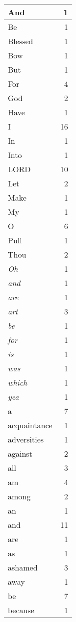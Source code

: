 \begin{center}
\begin{longtable}{l|r}
\hline \hline
\endlastfoot
And & 1 \\ \hline
Be & 1 \\ \hline
Blessed & 1 \\ \hline
Bow & 1 \\ \hline
But & 1 \\ \hline
For & 4 \\ \hline
God & 2 \\ \hline
Have & 1 \\ \hline
I & 16 \\ \hline
In & 1 \\ \hline
Into & 1 \\ \hline
LORD & 10 \\ \hline
Let & 2 \\ \hline
Make & 1 \\ \hline
My & 1 \\ \hline
O & 6 \\ \hline
Pull & 1 \\ \hline
Thou & 2 \\ \hline
\emph{Oh} & 1 \\ \hline
\emph{and} & 1 \\ \hline
\emph{are} & 1 \\ \hline
\emph{art} & 3 \\ \hline
\emph{be} & 1 \\ \hline
\emph{for} & 1 \\ \hline
\emph{is} & 1 \\ \hline
\emph{was} & 1 \\ \hline
\emph{which} & 1 \\ \hline
\emph{yea} & 1 \\ \hline
a & 7 \\ \hline
acquaintance & 1 \\ \hline
adversities & 1 \\ \hline
against & 2 \\ \hline
all & 3 \\ \hline
am & 4 \\ \hline
among & 2 \\ \hline
an & 1 \\ \hline
and & 11 \\ \hline
are & 1 \\ \hline
as & 1 \\ \hline
ashamed & 3 \\ \hline
away & 1 \\ \hline
be & 7 \\ \hline
because & 1 \\ \hline

\end{longtable}
\end{center}
